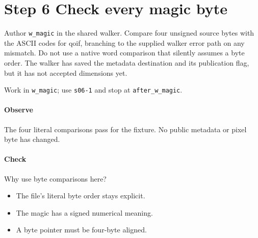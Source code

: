 \section{Step 6 Check every magic byte}\label{qoi-s06}
Author \texttt{w\_magic} in the shared walker. Compare four unsigned source bytes with the ASCII codes for qoif, branching to the supplied walker error path on any mismatch. Do not use a native word comparison that silently assumes a byte order. The walker has saved the metadata destination and its publication flag, but it has not accepted dimensions yet.

Work in \texttt{w\_magic}; use \texttt{s06-1} and stop at \texttt{after\_w\_magic}.

\paragraph{Observe} The four literal comparisons pass for the fixture. No public metadata or pixel byte has changed.

\paragraph{Check} Why use byte comparisons here?
\begin{itemize}
\item[A.] The file’s literal byte order stays explicit.
\item[B.] The magic has a signed numerical meaning.
\item[C.] A byte pointer must be four-byte aligned.
\end{itemize}
